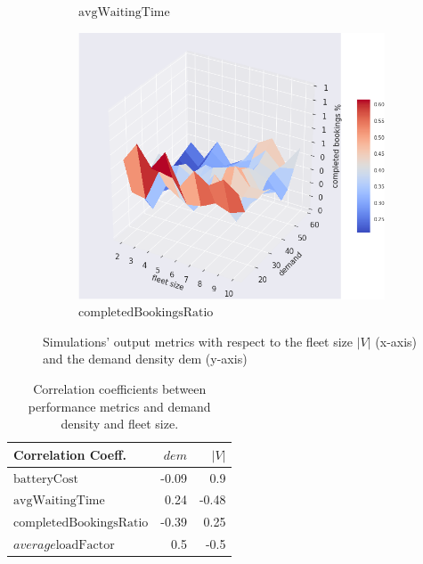\documentclass[12pt,a4paper]{article}
\begin{document}
\begin{figure}
\begin{subfigure}[b]{0.45\textwidth}
  \caption{$\text{avgWaitingTime}$}
  \label{wtcost}
\end{subfigure}
\begin{subfigure}[b]{0.458\textwidth}
  \includegraphics[width=\linewidth]{./images/completed.png}
  \caption{$\text{completedBookingsRatio}$}
  \label{cbr}
\end{subfigure}
\caption{Simulations' output metrics with respect to the fleet size $|V|$ (x-axis) and the demand density $\text{dem}$ (y-axis)}
\label{simustate}
\end{figure}


  \begin{table}

  \center
    \begin{tabular}{|l|r|r|}
     \toprule
    Correlation Coeff.& $dem$ & $|V|$ \\
    \midrule
    $\text{batteryCost}$ & -0.09 & 0.9\\
    $\text{avgWaitingTime}$ & 0.24 & -0.48\\
    $\text{completedBookingsRatio}$ & -0.39 & 0.25 \\
    $average\text{loadFactor}$ & 0.5 & -0.5\\
    \midrule
    \end{tabular}
    \caption{Correlation coefficients between performance metrics and demand density and fleet size.}
    \label{correlation}
  \end{table}
\end{document}
